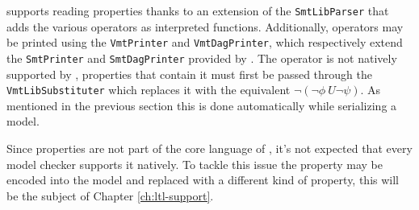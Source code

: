 \pyvmt{} supports reading \ltl{} properties thanks to an extension of the \texttt{SmtLibParser} that adds the various operators as interpreted functions. Additionally, \ltl{} operators may be printed using the \texttt{VmtPrinter} and \texttt{VmtDagPrinter}, which respectively extend the \texttt{SmtPrinter} and \texttt{SmtDagPrinter} provided by \pysmt{}. The \fR{} operator is not natively supported by \vmtlib{}, properties that contain it must first be passed through the \texttt{VmtLibSubstituter} which replaces it with the equivalent $\lnot (\lnot \phi\ U \lnot \psi)$. As mentioned in the previous section this is done automatically while serializing a model.

Since \ltl{} properties are not part of the core language of \vmtlib{}, it's not expected that every model checker supports it natively.
To tackle this issue the property may be encoded into the model and replaced with a different kind of property, this will be the subject of Chapter \ref{ch:ltl-support}.

